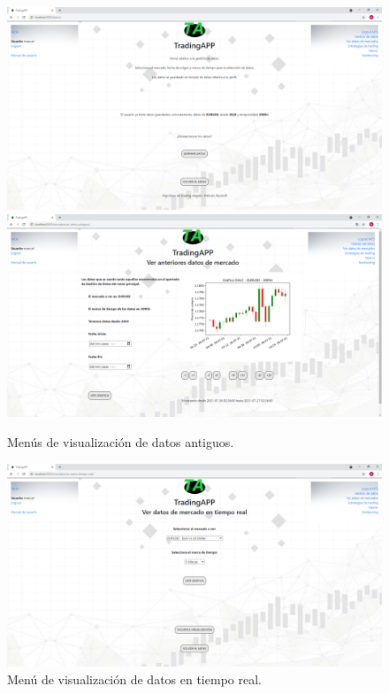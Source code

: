 \begin{figure}[h]
	\includegraphics[width=1.2\textwidth]{imagenes/diseno_final/menu_visualizacion_datos.png}\newline \\
	\includegraphics[width=1.2\textwidth]{imagenes/diseno_final/menu_visualizacion_datos_antiguos.png}
	
	\caption{Menús de visualización de datos antiguos.}  \label{6}
\end{figure}

\begin{figure}[h]
	\includegraphics[width=1.2\textwidth]{imagenes/diseno_final/menu_visualizacion_datos_tpo_real.png}
	
	\caption{Menú de visualización de datos en tiempo real.}  \label{7}
\end{figure}


	
